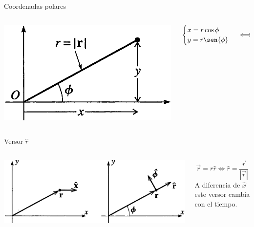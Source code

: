 \documentclass[serif]{beamer}
\begin{document}
\begin{frame}
\begin{block}{Coordenadas polares}
\begin{columns}[c]
	\begin{column}{0.35\textwidth}
		\includegraphics[width=\textwidth]{taylor1_10}
	\end{column}
  \begin{column}{0.65\textwidth}
		\[
		\begin{cases}
			x = r \cos{\phi}  \\
			y = r \sen{\phi}
		\end{cases}
		\iff
		\begin{cases}
			r = \sqrt{x^2+ y ^2} \\
			\phi = \atan{\frac{y}{x}}
		\end{cases}
		\]
	\end{column}
\end{columns}
\end{block}

\pause

\begin{block}{Versor \(\hat{r}\)}
\begin{columns}[c]
	\begin{column}{0.45\textwidth}
		\includegraphics[width=\textwidth]{taylor1_11}
	\end{column}
  \begin{column}{0.55\textwidth}
		\[
		\vec{r}= r \hat{r} \iff \hat{r}= \frac{\vec{r}}{|\vec{r}|}
			\]
		A diferencia de \(\hat{x}\) este versor cambia con el tiempo.
	\end{column}
\end{columns}
\end{block}
\end{frame}
\end{document}
